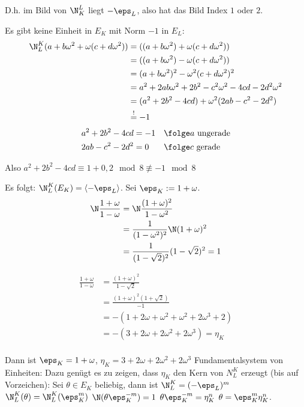 \renewcommand{\lecdate}{03.12.2014}

D.h. im Bild von $\N_K^L$ liegt $-\eps_L$, also hat das Bild Index $1$ oder $2$.

Es gibt keine Einheit in $E_K$ mit Norm $-1$ in $E_L$:
\begin{align*}
 \N_L^K(a+b\omega^2+\omega(c+d\omega^2))&=((a+b\omega^2)+\omega(c+d\omega^2))\\
 &= ((a+b\omega^2)-\omega(c+d\omega^2))\\
 &=(a+b\omega^2)^2-\omega^2(c+d\omega^2)^2\\
 &=a^2+2ab\omega^2+2b^2-c^2\omega^2-4cd-2d^2\omega^2\\
 &=(a^2+2b^2-4cd)+\omega^2(2ab-c^2-2d^2)\\
 &\overset{!}{=}-1
\end{align*}
\begin{align*}
 a^2+2b^2-4cd&=-1 && \folge a \text{ ungerade}\\
 2ab-c^2-2d^2&=0 && \folge c \text{ gerade}
\end{align*}

Also $a^2+2b^2-4cd\equiv 1+0,2 \mod{8}\not\equiv -1\mod{8}$

Es folgt: $\N_L^K(E_K)=\langle -\eps_L\rangle$. Sei $\eps_K:=1+\omega$.
\begin{align*}
\N\frac{1+\omega}{1-\omega}&=\N\frac{(1+\omega)^2}{1-\omega^2}\\ 
&=\frac{1}{(1-\omega^2)^2}\N(1+\omega)^2\\
&=\frac{1}{(1-\sqrt{2})^2}(1-\sqrt{2})^2=1 
\end{align*}

\begin{align*}
 \frac{1+\omega}{1-\omega}&=\frac{(1+\omega)^2}{1-\sqrt 2}\\
 &=\frac{(1+\omega)^2(1+\sqrt{2})}{-1}\\
 &=-(1+2\omega+\omega^2+\omega^2+2\omega^3+2)\\
 &=-(3+2\omega+2\omega^2+2\omega^3)=\eta_K\\
\end{align*}

Dann ist $\eps_K=1+\omega$, $\eta_K=3+2\omega+2\omega^2+2\omega^3$ Fundamentalsystem von Einheiten: Dazu genügt es zu zeigen, dass $\eta_K$ den Kern von $N_L^K$ erzeugt (bis auf Vorzeichen): Sei $\theta\in E_K$ beliebig, dann ist $\N_L^K=(-\eps_L)^m$ \folge $\N_L^K(\theta)=\N_L^K(\eps_K^m)$ \folge $\N(\theta\eps_K^{-m})=1$ \folge $\theta\eps_K^{-m}=\eta_K^n$ \folge $\theta=\eps_K^m\eta_K^n$.

